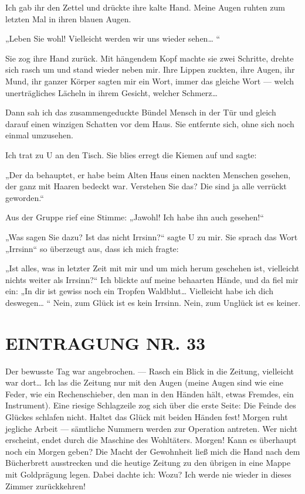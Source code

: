 Ich gab ihr den Zettel und drückte ihre kalte Hand. Meine Augen
ruhten zum letzten Mal in ihren blauen Augen.

„Leben Sie wohl! Vielleicht werden wir uns wieder sehen\ldots{} “

Sie zog ihre Hand zurück. Mit hängendem Kopf machte sie zwei
Schritte, drehte sich rasch um und stand wieder neben mir. Ihre
Lippen zuckten, ihre Augen, ihr Mund, ihr ganzer Körper sagten mir
ein Wort, immer das gleiche Wort — welch unerträgliches Lächeln in
ihrem Gesicht, welcher Schmerz\ldots{}

Dann sah ich das zusammengeduckte Bündel Mensch in der Tür und
gleich darauf einen winzigen Schatten vor dem Haus. Sie entfernte
sich, ohne sich noch einmal umzusehen.

Ich trat zu U an den Tisch. Sie blies erregt die Kiemen auf und
sagte:

„Der da behauptet, er habe beim Alten Haus einen nackten Menschen
gesehen, der ganz mit Haaren bedeckt war. Verstehen Sie das? Die
sind ja alle verrückt geworden.“

Aus der Gruppe rief eine Stimme: „Jawohl! Ich habe ihn auch
gesehen!“

„Was sagen Sie dazu? Ist das nicht Irrsinn?“ sagte U zu mir. Sie
sprach das Wort „Irrsinn“ so überzeugt aus, dass ich mich fragte:

„Ist alles, was in letzter Zeit mit mir und um mich herum geschehen
ist, vielleicht nichts weiter als Irrsinn?“ Ich blickte auf meine
behaarten Hände, und da fiel mir ein: „In dir ist gewiss noch ein
Tropfen Waldblut\ldots{} Vielleicht habe ich dich deswegen\ldots{} “ Nein,
zum Glück ist es kein Irrsinn. Nein, zum Unglück ist es keiner.

\section{EINTRAGUNG NR. 33}

Der bewusste Tag war angebrochen. — Rasch ein Blick in die Zeitung,
vielleicht war dort\ldots{} Ich las die Zeitung nur mit den Augen (meine
Augen sind wie eine Feder, wie ein Rechenschieber, den man in den
Händen hält, etwas Fremdes, ein Instrument). Eine riesige
Schlagzeile zog sich über die erste Seite: Die Feinde des Glückes
schlafen nicht. Haltet das Glück mit beiden Händen fest! Morgen
ruht jegliche Arbeit — sämtliche Nummern werden zur Operation
antreten. Wer nicht erscheint, endet durch die Maschine des
Wohltäters. Morgen! Kann es überhaupt noch ein Morgen geben? Die
Macht der Gewohnheit ließ mich die Hand nach dem Bücherbrett
ausstrecken und die heutige Zeitung zu den übrigen in eine Mappe
mit Goldprägung legen. Dabei dachte ich: Wozu? Ich werde nie wieder
in dieses Zimmer zurückkehren!

